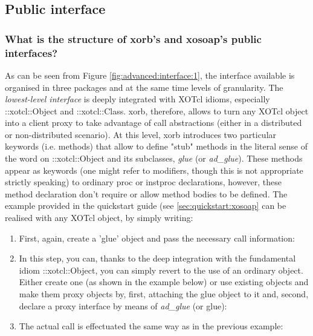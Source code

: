     \subsection{Public interface}
  \subsubsection{What is the structure of xorb's and xosoap's public interfaces?}\label{sec:advanced:interface:what}
  As can be seen from Figure \ref{fig:advanced:interface:1}, the interface available is organised in three packages and at the same time levels of granularity. The \emph{lowest-level interface} is deeply integrated with XOTcl idioms, especially ::xotcl::Object and ::xotcl::Class. xorb, therefore, allows to turn any XOTcl object into a client proxy to take advantage of call abstractions (either in a distributed or non-distributed scenario). At this level, xorb introduces two particular keywords (i.e. methods) that allow to define "stub" methods in the literal sense of the word on ::xotcl::Object and its subclasses, \emph{glue} (or \emph{ad\_glue}). These methods appear as keywords (one might refer to modifiers, though this is not appropriate strictly speaking) to ordinary proc or instproc declarations, however, these method declaration don't require or allow method bodies to be defined. The example provided in the quickstart guide (see \ref{sec:quickstart:xosoap} can be realised with any XOTcl object, by simply writing:
  \begin{enumerate}
\item First, again, create a 'glue' object and pass the necessary call information: 
\item In this step, you can, thanks to the deep integration with the fundamental idiom ::xotcl::Object, you can simply revert to the use of an ordinary object. Either create one (as shown in the example below) or use existing objects and make them proxy objects by, first, attaching the glue object to it and, second, declare a proxy interface by means of \emph{ad\_glue} (or glue):


\item The actual call is effectuated the same way as in the previous example:

  \end{enumerate}
